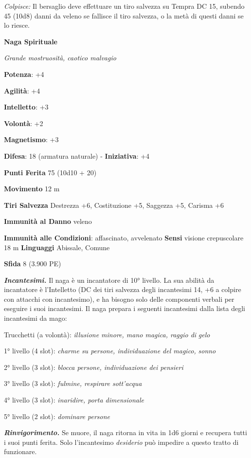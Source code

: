 \begin{multicols}{2}
\emph{Colpisce:} Il bersaglio deve effettuare un tiro salvezza su Tempra DC 15, subendo 45 (10d8) danni da veleno se fallisce il
tiro salvezza, o la metà di questi danni se lo riesce.

\textbf{Naga Spirituale}

\emph{Grande mostruosità, caotico malvagio}

\textbf{Potenza}: +4

\textbf{Agilità}: +4

\textbf{Intelletto}: +3

\textbf{Volontà}: +2

\textbf{Magnetismo}: +3

\textbf{Difesa}: 18 (armatura naturale) - \textbf{Iniziativa}: +4

\textbf{Punti Ferita} 75 (10d10 + 20)

\textbf{Movimento} 12 m

\textbf{Tiri Salvezza} Destrezza +6, Costituzione +5, Saggezza +5,
Carisma +6

\textbf{Immunità al Danno} veleno

\textbf{Immunità alle Condizioni}: affascinato, avvelenato \textbf{Sensi}
visione crepuscolare 18 m \textbf{Linguaggi} Abissale,
Comune

\textbf{Sfida} 8 (3.900 PE)\smallskip

\emph{\textbf{Incantesimi.}} Il naga è un incantatore di 10° livello. La
sua abilità da incantatore è l'Intelletto (DC dei tiri salvezza degli
incantesimi 14, +6 a colpire con attacchi con incantesimo), e ha bisogno
solo delle componenti verbali per eseguire i suoi incantesimi. Il naga
prepara i seguenti incantesimi dalla lista degli incantesimi da mago:

Trucchetti (a volontà): \emph{illusione minore, mano magica, raggio di}
\emph{gelo}

1° livello (4 slot): \emph{charme su persone, individuazione del
magico,} \emph{sonno}

2° livello (3 slot): \emph{blocca persone, individuazione dei pensieri}

3° livello (3 slot): \emph{fulmine, respirare sott'acqua}

4° livello (3 slot): \emph{inaridire, porta dimensionale}

5° livello (2 slot): \emph{dominare persone}

\emph{\textbf{Rinvigorimento.}} Se muore, il naga ritorna in vita in 1d6
giorni e recupera tutti i suoi punti ferita. Solo l'incantesimo
\emph{desiderio} può impedire a questo tratto di funzionare.


\end{multicols}

